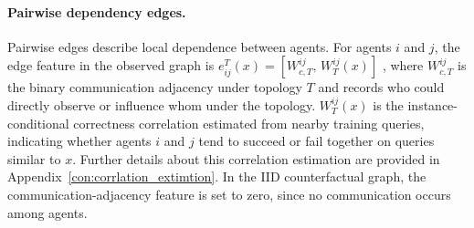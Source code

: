 
\paragraph{Pairwise dependency edges.}
Pairwise edges describe local dependence between agents. 
For agents $i$ and $j$, the edge feature in the observed graph is
$
e_{ij}^T(x)
=
[
W_{c,T}^{ij},\,
W_T^{ij}(x)
]
$
, where $W^{ij}_{c,T}$ is the binary communication adjacency under topology $T$ and records who could directly observe or influence whom under the topology. $W_T^{ij}(x)$ is the instance-conditional correctness correlation estimated from nearby training queries, indicating whether agents $i$ and $j$ tend to succeed or fail together on queries similar to $x$.  Further details about this correlation estimation are provided in Appendix~\ref{con:corrlation_extimtion}. 
In the IID counterfactual graph, the communication-adjacency feature is set to zero, since no communication occurs among agents.



